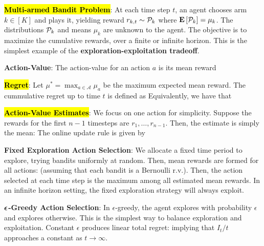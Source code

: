 \documentclass{article}
\begin{document}
  \textbf{\hl{Multi-armed Bandit Problem}}: At each time step $t$, an agent chooses arm $k\in[K]$ and plays it, yielding reward $r_{k,t}\sim \mathcal{P}_k$ where $\mathbf{E}\left[ \mathcal{P}_k \right]=\mu_k$. The distributions $\mathcal{P}_k$ and means $\mu_k$ are unknown to the agent. The objective is to maximize the cumulative rewards, over a finite or infinite horizon. This is the simplest example of the \textbf{exploration-exploitation tradeoff}.

  \textbf{Action-Value}: The action-value for an action $a$ is its mean reward

  \textbf{\hl{Regret}}: Let $\mu^*=\max_{a\in\mathcal{A}} \mu_a$ be the maximum expected mean reward. The cummulative regret up to time $t$ is defined as
  Equivalently, we have that

  \textbf{\hl{Action-Value Estimates}}: We focus on one action for simplicity. Suppose the rewards for the first $n-1$ timesteps are $r_1,\dots,r_{n-1}$. Then, the estimate is simply the mean:
  The online update rule is given by

  \textbf{Fixed Exploration Action Selection}: We allocate a fixed time period to explore, trying bandits uniformly at random. Then, mean rewards are formed for all actions:
  (assuming that each bandit is a Bernoulli r.v.). Then, the action selected at each time step is the maximum among all estimated mean rewards. In an infinite horizon setting, the fixed exploration strategy will always exploit.

  \textbf{$\boldsymbol{\epsilon}$-Greedy Action Selection}: In $\epsilon$-greedy, the agent explores with probability $\epsilon$ and explores otherwise. This is the simplest way to balance exploration and exploitation. Constant $\epsilon$ produces linear total regret:
  implying that $I_t/t$ approaches a constant as $t\to\infty$.
\end{document}

